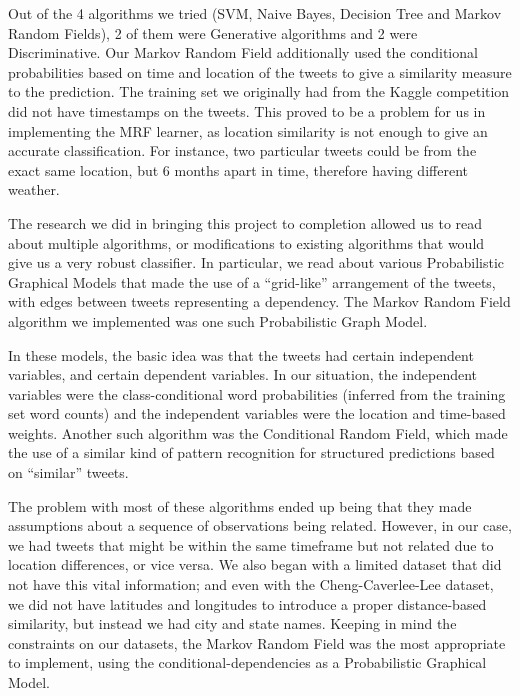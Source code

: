 	Out of the 4 algorithms we tried (SVM, Naive Bayes, Decision Tree and Markov Random Fields), 2 of them were Generative algorithms and 2 were Discriminative. Our Markov Random Field additionally used the conditional probabilities based on time and location of the tweets to give a similarity measure to the prediction. The training set we originally had from the Kaggle competition did not have timestamps on the tweets. This proved to be a problem for us in implementing the MRF learner, as location similarity is not enough to give an accurate classification. For instance, two particular tweets could be from the exact same location, but 6 months apart in time, therefore having different weather. 

	The research we did in bringing this project to completion allowed us to read about multiple algorithms, or modifications to existing algorithms that would give us a very robust classifier. In particular, we read about various Probabilistic Graphical Models that made the use of a ``grid-like'' arrangement of the tweets, with edges between tweets representing a dependency. The Markov Random Field algorithm we implemented was one such Probabilistic Graph Model. 

	In these models, the basic idea was that the tweets had certain independent variables, and certain dependent variables. In our situation, the independent variables were the class-conditional word probabilities (inferred from the training set word counts) and the independent variables were the location and time-based weights. Another such algorithm was the Conditional Random Field, which made the use of a similar kind of pattern recognition for structured predictions based on ``similar'' tweets. 

	The problem with most of these algorithms ended up being that they made assumptions about a sequence of observations being related. However, in our case, we had tweets that might be within the same timeframe but not related due to location differences, or vice versa. We also began with a limited dataset that did not have this vital information; and even with the Cheng-Caverlee-Lee dataset, we did not have latitudes and longitudes to introduce a proper distance-based similarity, but instead we had city and state names. Keeping in mind the constraints on our datasets, the Markov Random Field was the most appropriate to implement, using the conditional-dependencies as a Probabilistic Graphical Model.